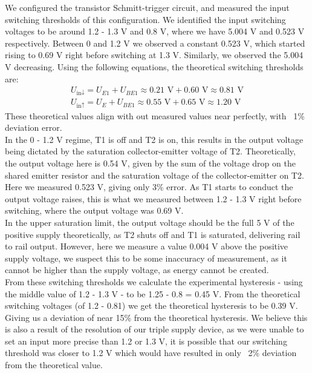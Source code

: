 \documentclass[12pt]{article}
\begin{document}
We configured the transistor Schmitt-trigger circuit, and measured the 
input switching thresholds of this configuration. We identified the input 
switching voltages to be around 1.2 - 1.3 V and 0.8 V, where we have 5.004 V and 
0.523 V respectively. Between 0 and 1.2 V we observed a constant 0.523 V, which started 
rising to 0.69 V right before switching at 1.3 V. Similarly, we observed the 5.004 V 
decreasing. Using the following equations, the theoretical switching thresholds are:
\begin{gather*}
    U_{\text{in}\downarrow} = U_{E1} + U_{BE1} \approx 0.21\text{ V} + 0.60\text{ V} \approx 0.81\text{ V}\\[1.2em]
    U_{\text{in}\uparrow} = U_E + U_{BE1} \approx 0.55\text{ V} + 0.65\text{ V} \approx 1.20 \text{ V}
\end{gather*}
These theoretical values align with out measured values near perfectly, with ~1\% deviation error.\\
In the 0 - 1.2 V regime, T1 is off and T2 is on, this results in the output 
voltage being dictated by the saturation collector-emitter voltage of T2. Theoretically, 
the output voltage here is 0.54 V, given by the sum of the voltage drop on the shared 
emitter resistor and the saturation voltage of the collector-emitter on T2. 
Here we measured 0.523 V, giving only 3\% error. As T1 starts to conduct 
the output voltage raises, this is what we measured between 1.2 - 1.3 V right before 
switching, where the output voltage was 0.69 V. \\
In the upper saturation limit, the output voltage should be the full 5 V of the 
positive supply theoretically, as T2 shuts off and T1 is saturated, delivering rail to rail 
output. However, here we measure a value 0.004 V above the positive supply voltage, 
we suspect this to be some inaccuracy of measurement, as it cannot be higher than the 
supply voltage, as energy cannot be created.\\
From these switching thresholds we calculate the experimental hysteresis - using 
the middle value of 1.2 - 1.3 V - to be 1.25 - 0.8 = 0.45 V. From the theoretical 
switching voltages (of 1.2 - 0.81) we get the theoretical hysteresis to be 0.39 V.
Giving us a deviation of near 15\% from the theoretical hysteresis. We believe this 
is also a result of the resolution of our triple supply device, as we were unable to 
set an input more precise than 1.2 or 1.3 V, it is possible that our switching threshold 
was closer to 1.2 V which would have resulted in only ~2\% deviation from the theoretical value.
\end{document}
